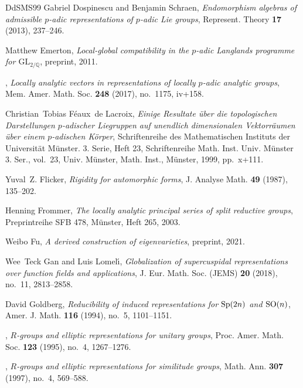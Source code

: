 \documentclass[a4paper]{amsart}
\numberwithin{equation}{section}
\theoremstyle{remark}
\theoremstyle{definition}
\newcommand{\Q}{\mathbb{Q}}
\begin{document}
\begin{thebibliography}{DdSMS99}
Gabriel Dospinescu and Benjamin Schraen, \emph{Endomorphism algebras of
  admissible {$p$}-adic representations of {$p$}-adic {L}ie groups}, Represent.
  Theory \textbf{17} (2013), 237--246. 

Matthew Emerton, \emph{Local-global compatibility in the $p$-adic {L}anglands
  programme for $\mathrm{GL}_{2/\Q}$}, preprint, 2011.

\bysame, \emph{Locally analytic vectors in representations of locally
  {$p$}-adic analytic groups}, Mem. Amer. Math. Soc. \textbf{248} (2017),
  no.~1175, iv+158. 

Christian~Tobias F\'eaux~de Lacroix, \emph{Einige {R}esultate \"uber die
  topologischen {D}arstellungen {$p$}-adischer {L}iegruppen auf unendlich
  dimensionalen {V}ektorr\"aumen \"uber einem {$p$}-adischen {K}\"orper},
  Schriftenreihe des {M}athematischen {I}nstituts der {U}niversit\"at
  {M}\"unster. 3. {S}erie, {H}eft 23, Schriftenreihe Math. Inst. Univ.
  M\"unster 3. Ser., vol.~23, Univ. M\"unster, Math. Inst., M\"unster, 1999,
  pp.~x+111. 

Yuval~Z. Flicker, \emph{Rigidity for automorphic forms}, J. Analyse Math.
  \textbf{49} (1987), 135--202. 

Henning Frommer, \emph{The locally analytic principal series of split reductive
  groups}, Preprintreihe SFB 478, M\"unster, Heft 265, 2003.

Weibo Fu, \emph{A derived construction of eigenvarieties}, preprint, 2021.

Wee~Teck Gan and Luis Lomel\'{\i}, \emph{Globalization of supercuspidal
  representations over function fields and applications}, J. Eur. Math. Soc.
  (JEMS) \textbf{20} (2018), no.~11, 2813--2858. 

David Goldberg, \emph{Reducibility of induced representations for {${\rm
  Sp}(2n)$} and {${\rm SO}(n)$}}, Amer. J. Math. \textbf{116} (1994), no.~5,
  1101--1151. 

\bysame, \emph{{$R$}-groups and elliptic representations for unitary groups},
  Proc. Amer. Math. Soc. \textbf{123} (1995), no.~4, 1267--1276. 

\bysame, \emph{{$R$}-groups and elliptic representations for similitude
  groups}, Math. Ann. \textbf{307} (1997), no.~4, 569--588. 


\end{thebibliography}
\end{document}
